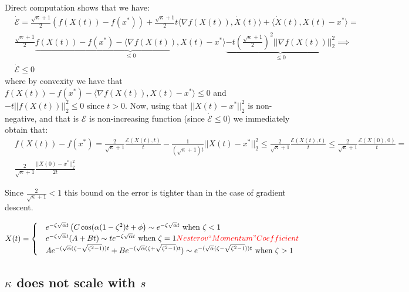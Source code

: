 Direct computation shows that we have:
\begin{align*}
    & \dot{\mathcal{E}}= \frac{\sqrt{\kappa}+1}{2}(f(X(t)) - f(x^*)) + \frac{\sqrt{\kappa}+1}{2} t \langle \nabla f(X(t)), \dot{X}(t) \rangle + \langle \dot{X}(t), X(t)-x^* \rangle = \\
    & \frac{\sqrt{\kappa}+1}{2} \underbrace{f(X(t)) - f(x^*) - \langle \nabla f(X(t)), X(t) - x^* \rangle}_{\leq 0} \underbrace{- t (\frac{\sqrt{\kappa}+1}{2})^2 || \nabla f(X(t))||_2^2}_{\leq 0} \implies \\
    & \dot{\mathcal{E}} \leq 0
\end{align*}
where by convexity we have that $f(X(t)) - f(x^*) - \langle \nabla f(X(t)), X(t) - x^* \rangle \leq 0$ and $ - t ||f(X(t))||_2^2 \leq 0$ since $t>0$. Now, using that $||X(t)-x^*||_2^2$ is non-negative, and that is $\mathcal{E}$ is non-increasing function (since $\dot{\mathcal{E}} \leq 0$) we immediately obtain that:
\begin{align*}
    & f(X(t)) - f(x^*) = \frac{2}{\sqrt{\kappa}+1} \frac{\mathcal{E}(X(t), t)}{t} - \frac{1}{(\sqrt{\kappa}+1)t} ||X(t) - x^*||_2^2 \leq \frac{2}{\sqrt{\kappa}+1} \frac{\mathcal{E}(X(t), t)}{t} \leq \frac{2}{\sqrt{\kappa}+1} \frac{\mathcal{E}(X(0), 0)}{t} = \\ & \frac{2}{\sqrt{\kappa}+1} \frac{||X(0)-x^*||_2^2}{2t}
\end{align*}

Since $\frac{2}{\sqrt{\kappa}+1} < 1$ this bound on the error is tighter than in the case of gradient descent.

 
 
\begin{align*}
   X(t) = \begin{cases}
   & e^{-\zeta \sqrt{\alpha} t} \left( C \cos(\alpha(1-\zeta^2) t+\phi \right) \sim e^{-\zeta \sqrt{\alpha} t}\text{ when } \zeta < 1 \\
   & e^{-\zeta \sqrt{\alpha} t}(A+B t) \sim t e^{-\zeta \sqrt{\alpha} t} \text{ when } \zeta = 1 \textcolor{red}{Nesterov ``Momentum" Coefficient}\\
   & A e^{ -(\sqrt{\alpha}(\zeta - \sqrt{\zeta^2-1})) t}+ B e^{ -(\sqrt{\alpha}(\zeta + \sqrt{\zeta^2-1}) t}) \sim e^{ -(\sqrt{\alpha}(\zeta - \sqrt{\zeta^2-1})) t}  \text{ when } \zeta > 1
   \end{cases}
\end{align*}
 
 \subsection{$\kappa$ does not scale with $s$}

